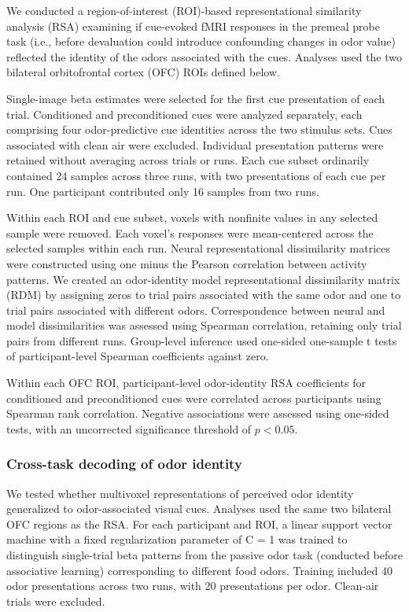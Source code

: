 \documentclass[12pt,letterpaper]{article}
\begin{document}
We conducted a region-of-interest (ROI)-based representational similarity analysis (RSA) examining if cue-evoked fMRI responses in the premeal probe task (i.e., before devaluation could introduce confounding changes in odor value) reflected the identity of the odors associated with the cues. Analyses used the two bilateral orbitofrontal cortex (OFC) ROIs defined below.

Single-image beta estimates were selected for the first cue presentation of each trial. Conditioned and preconditioned cues were analyzed separately, each comprising four odor-predictive cue identities across the two stimulus sets. Cues associated with clean air were excluded. Individual presentation patterns were retained without averaging across trials or runs. Each cue subset ordinarily contained 24 samples across three runs, with two presentations of each cue per run. One participant contributed only 16 samples from two runs.

Within each ROI and cue subset, voxels with nonfinite values in any selected sample were removed. Each voxel’s responses were mean-centered across the selected samples within each run. Neural representational dissimilarity matrices were constructed using one minus the Pearson correlation between activity patterns. We created an odor-identity model representational dissimilarity matrix (RDM) by assigning zeros to trial pairs associated with the same odor and one to trial pairs associated with different odors. Correspondence between neural and model dissimilarities was assessed using Spearman correlation, retaining only trial pairs from different runs. Group-level inference used one-sided one-sample t tests of participant-level Spearman coefficients against zero.

Within each OFC ROI, participant-level odor-identity RSA coefficients for conditioned and preconditioned cues were correlated across participants using Spearman rank correlation. Negative associations were assessed using one-sided tests, with an uncorrected significance threshold of $p < 0.05$.

\subsubsection*{Cross-task decoding of odor identity}

We tested whether multivoxel representations of perceived odor identity generalized to odor-associated visual cues. Analyses used the same two bilateral OFC regions as the RSA. For each participant and ROI, a linear support vector machine with a fixed regularization parameter of C = 1 was trained to distinguish single-trial beta patterns from the passive odor task (conducted before associative learning) corresponding to different food odors. Training included 40 odor presentations across two runs, with 20 presentations per odor. Clean-air trials were excluded.
\end{document}
